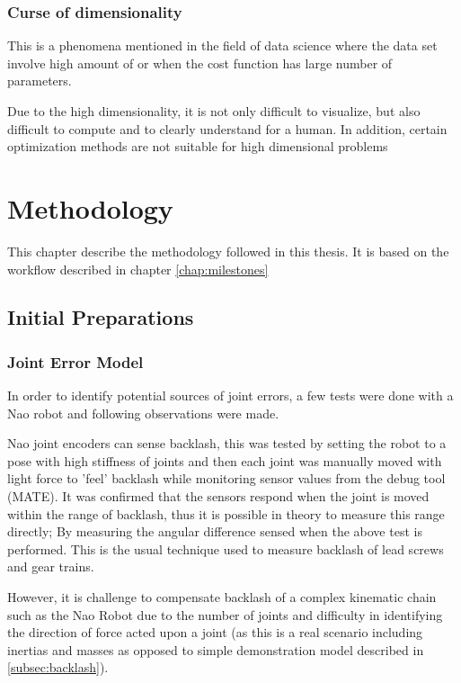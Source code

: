 \documentclass[english, printversion, nomenclature, notitle]{tuvisionthesis} %
\begin{document}

\subsection{Curse of dimensionality}
This is a phenomena mentioned in the field of data science where the data set involve high amount of or when the cost function has large number of parameters.

Due to the high dimensionality, it is not only difficult to visualize, but also difficult to compute and to clearly understand for a human. In addition, certain optimization methods are not suitable for high dimensional problems 

\chapter{Methodology}
\label{chap:methodology}
This chapter describe the methodology followed in this thesis. It is based on the workflow described in chapter \cref{chap:milestones}

\section{Initial Preparations}

\subsection{Joint Error Model}
\label{subsec:initial_joint_error}

In order to identify potential sources of joint errors, a few tests were done with a Nao robot and following observations were made.

Nao joint encoders can sense backlash, this was tested by setting the robot to a pose with high stiffness of joints and then each joint was manually moved with light force to 'feel' backlash while monitoring sensor values from the debug tool (MATE). It was confirmed that the sensors respond when the joint is moved within the range of backlash, thus it is possible in theory to measure this range directly; By measuring the angular difference sensed when the above test is performed. This is the usual technique used to measure backlash of lead screws and gear trains.

However, it is challenge to compensate backlash of a complex kinematic chain such as the Nao Robot due to the number of joints and difficulty in identifying the direction of force acted upon a joint (as this is a real scenario including inertias and masses as opposed to simple demonstration model described in \cref{subsec:backlash}).
\end{document}
